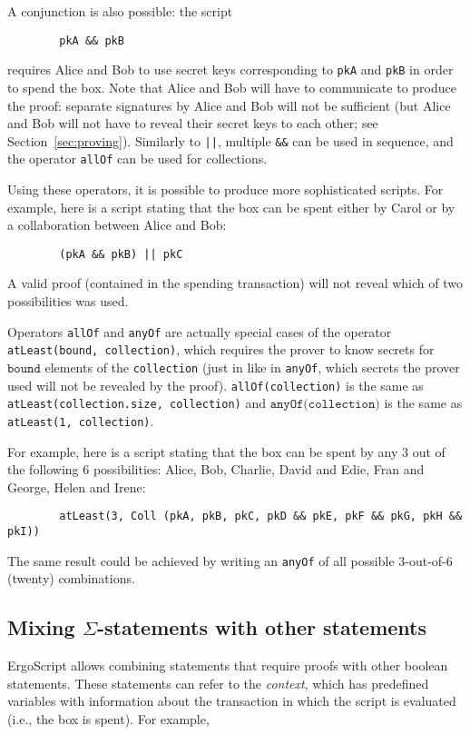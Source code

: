 \documentclass[11pt]{article}
\newcommand{\langname}{ErgoScript\xspace}
\begin{document}
A conjunction is also possible: the script
\begin{verbatim}
        pkA && pkB
\end{verbatim}
requires Alice and Bob to use secret keys corresponding to \texttt{pkA} and \texttt{pkB} in order to spend the box. Note that Alice and Bob will have to communicate to produce the proof: separate signatures by Alice and Bob will not be sufficient (but Alice and Bob will not have to reveal their secret keys to each other; see Section~\ref{sec:proving}). Similarly to \texttt{||}, multiple \texttt{\&\&} can be used in sequence, and the operator \texttt{allOf} can be used for collections.


Using these operators, it is possible to produce more sophisticated scripts. For example, here is a script stating that the box can be spent either by Carol or by a collaboration between Alice and Bob:

\begin{verbatim}
        (pkA && pkB) || pkC
\end{verbatim}


A valid proof (contained in the spending transaction) will not reveal which of two possibilities was used.

Operators \texttt{allOf} and \texttt{anyOf} are actually special cases of the operator \texttt{atLeast(bound, collection)}, which requires the prover to know secrets for $\texttt{bound}$ elements of the \texttt{collection} (just in like in \texttt{anyOf}, which secrets the prover used will not be revealed by the proof). \texttt{allOf(collection)} is the same as \texttt{atLeast(collection.size, collection)} and $\texttt{anyOf(collection)}$ is the same as \texttt{atLeast(1, collection)}.

For example, here is a script stating that the box can be spent by any 3 out of the following 6 possibilities: Alice, Bob, Charlie, David and Edie, Fran and George, Helen and Irene:
\begin{verbatim}
        atLeast(3, Coll (pkA, pkB, pkC, pkD && pkE, pkF && pkG, pkH && pkI))
\end{verbatim}
The same result could be achieved by writing an \texttt{anyOf} of all possible 3-out-of-6 (twenty) combinations.

\subsection{Mixing $\Sigma$-statements with other statements}
\langname allows combining statements that require proofs with other boolean statements. These statements can refer to the \emph{context}, which has predefined variables with information about the transaction in which the script is evaluated (i.e., the box is spent). For example,
\end{document}
